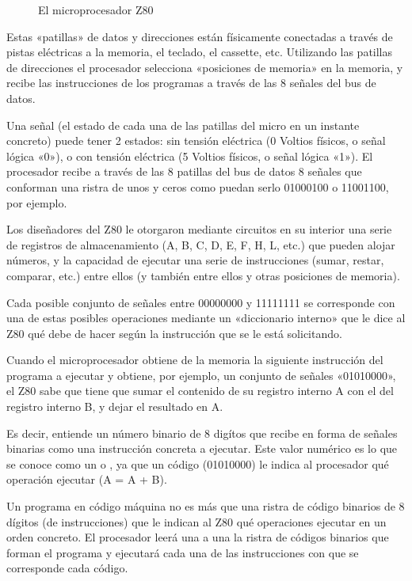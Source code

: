 \documentclass[letterpaper,10pt,spanish]{sphinxmanual}
\begin{document}
\begin{figure}[htbp]
\centering
\capstart

\noindent{}
\caption{El microprocesador Z80}\label{\detokenize{02_introduccion/introduccion:id3}}\end{figure}

Estas «patillas» de datos y direcciones están físicamente conectadas a través de pistas eléctricas a la memoria, el teclado, el cassette, etc. Utilizando las patillas de direcciones el procesador selecciona «posiciones de memoria» en la memoria, y recibe las instrucciones de los programas a través de las 8 señales del bus de datos.

Una señal (el estado de cada una de las patillas del micro en un instante concreto) puede tener 2 estados: sin tensión eléctrica (0 Voltios físicos, o señal lógica «0»), o con tensión eléctrica (5 Voltios físicos, o señal lógica «1»). El procesador recibe a través de las 8 patillas del bus de datos 8 señales que conforman una ristra de unos y ceros como puedan serlo 01000100 o 11001100, por ejemplo.

Los diseñadores del Z80 le otorgaron mediante circuitos en su interior una serie de registros de almacenamiento (A, B, C, D, E, F, H, L, etc.) que pueden alojar números, y la capacidad de ejecutar una serie de instrucciones (sumar, restar, comparar, etc.) entre ellos (y también entre ellos y otras posiciones de memoria).

Cada posible conjunto de señales entre 00000000 y 11111111 se corresponde con una de estas posibles operaciones mediante un «diccionario interno» que le dice al Z80 qué debe de hacer según la instrucción que se le está solicitando.

Cuando el microprocesador obtiene de la memoria la siguiente instrucción del programa a ejecutar y obtiene, por ejemplo, un conjunto de señales «01010000», el Z80 sabe que tiene que sumar el contenido de su registro interno A con el del registro interno B, y dejar el resultado en A.

Es decir, entiende un número binario de 8 digítos que recibe en forma de señales binarias como una instrucción concreta a ejecutar. Este valor numérico es lo que se conoce como un  o , ya que un código (01010000) le indica al procesador qué operación ejecutar (A = A + B).

Un programa en código máquina no es más que una ristra de código binarios de 8 dígitos (de instrucciones) que le indican al Z80 qué operaciones ejecutar en un orden concreto. El procesador leerá una a una la ristra de códigos binarios que forman el programa y ejecutará cada una de las instrucciones con que se corresponde cada código.
\end{document}
